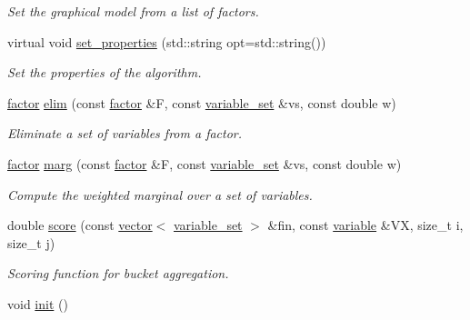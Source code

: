 \begin{DoxyCompactItemize}
\begin{DoxyCompactList}\small\item\em Set the graphical model from a list of factors. \end{DoxyCompactList}\item 
virtual void \hyperlink{classmerlin_1_1wmb_aa8868851a3f7c8d1c43326f431bd1132}{set\+\_\+properties} (std\+::string opt=std\+::string())
\begin{DoxyCompactList}\small\item\em Set the properties of the algorithm. \end{DoxyCompactList}\item 
\hyperlink{classmerlin_1_1factor}{factor} \hyperlink{classmerlin_1_1wmb_a9acbede3a21446ef005eaae637ec344e}{elim} (const \hyperlink{classmerlin_1_1factor}{factor} \&F, const \hyperlink{classmerlin_1_1variable__set}{variable\+\_\+set} \&vs, const double w)
\begin{DoxyCompactList}\small\item\em Eliminate a set of variables from a factor. \end{DoxyCompactList}\item 
\hyperlink{classmerlin_1_1factor}{factor} \hyperlink{classmerlin_1_1wmb_a6abd46dbb20aa12ef7b2bfa93cefc36d}{marg} (const \hyperlink{classmerlin_1_1factor}{factor} \&F, const \hyperlink{classmerlin_1_1variable__set}{variable\+\_\+set} \&vs, const double w)
\begin{DoxyCompactList}\small\item\em Compute the weighted marginal over a set of variables. \end{DoxyCompactList}\item 
double \hyperlink{classmerlin_1_1wmb_aa4cadd87c907327227427ba1f9555350}{score} (const \hyperlink{classmerlin_1_1vector}{vector}$<$ \hyperlink{classmerlin_1_1variable__set}{variable\+\_\+set} $>$ \&fin, const \hyperlink{classmerlin_1_1variable}{variable} \&VX, size\+\_\+t i, size\+\_\+t j)
\begin{DoxyCompactList}\small\item\em Scoring function for bucket aggregation. \end{DoxyCompactList}\item 
void \hyperlink{classmerlin_1_1wmb_ac9a83bcbef3f06a48d6cd9bea8ad3ce6}{init} ()\hypertarget{classmerlin_1_1wmb_ac9a83bcbef3f06a48d6cd9bea8ad3ce6}{}\label{classmerlin_1_1wmb_ac9a83bcbef3f06a48d6cd9bea8ad3ce6}


\end{DoxyCompactItemize}

